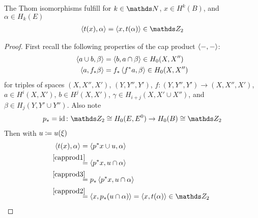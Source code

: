 \begin{Lem}
  The Thom isomorphisms fulfill for $k\in\Nat$, $x\in H^k(B)$, and $\alpha\in H_k(E)$
  \begin{gather*}
    \capped{t(x)}{\alpha} = \capped{x}{t(\alpha)} \in\Zmod2
  \end{gather*}
  \begin{proof}
    First recall the following properties of the cap product
    $\left\langle -, - \right\rangle$:
    \begin{align}
      \label{capprod1}
      \left\langle a\cup b, \beta \right\rangle &= \left\langle b, a\cap\beta \right\rangle
      \in H_0(X,X'')\\
      \label{capprod2}
      \left\langle a, {f}_* \beta \right\rangle &= {f}_* \left\langle {f}^* a, \beta \right\rangle
      \in H_0(X,X'')
    \end{align}
    for
    triples of spaces $(X, X'', X')$, $(Y, Y'', Y')$,
    $f\colon (Y,Y'',Y')\to (X,X'',X')$,
    $a\in H^i(X,X')$, $b\in H^j(X,X')$,
    $\gamma\in H_{i+j}(X, X'\cup X'')$,
    and
    $\beta\in H_j(Y, Y'\cup Y'')$.
    Also note
    \begin{gather}
      \label{capprod3}
      \pf p = \Id \colon
      \Zmod2\cong H_0(\thomspacepair{E})\to H_0(B)\cong\Zmod2
    \end{gather}
    Then with $u\coloneqq u(\xi)$
    \begin{align*}
      \capped{t(x)}{\alpha}
      &= \capped{\pb p x \cup \u}{\alpha} \\
      &\overset{\mathllap{\eqref{capprod1}}}=
        \capped{\pb p x}{\u\cap\alpha} \\
      &\overset{\mathllap{\eqref{capprod3}}}=
        \pf p\capped{\pb p x}{\u\cap\alpha} \\
      &\overset{\mathllap{\eqref{capprod2}}}=
        \capped{x}{\pf p(u\cap\alpha)}
        = \capped{x}{\thomiso (\alpha)} \in\Zmod2
    \end{align*}
  \end{proof}
\end{Lem}


